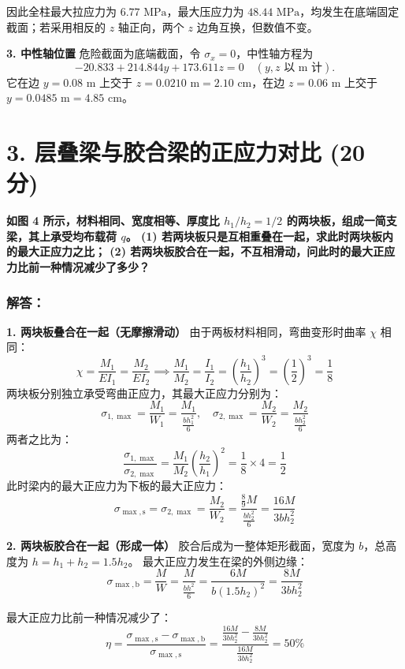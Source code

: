 \documentclass[11pt,a4paper]{ctexrep}
\begin{document}
{因此全柱最大拉应力为 $6.77\text{ MPa}$，最大压应力为 $48.44\text{ MPa}$，均发生在底端固定截面；若采用相反的 $z$ 轴正向，两个 $z$ 边角互换，但数值不变。

\textbf{3. 中性轴位置}
危险截面为底端截面，令 $\sigma_x=0$，中性轴方程为
\[
-20.833+214.844y+173.611z=0\quad(y,z\text{ 以 m 计}).
\]
它在边 $y=0.08\text{ m}$ 上交于 $z=0.0210\text{ m}=2.10\text{ cm}$，在边 $z=0.06\text{ m}$ 上交于 $y=0.0485\text{ m}=4.85\text{ cm}$。




\section*{3. 层叠梁与胶合梁的正应力对比 (20 分)}

\textbf{如图 4 所示，材料相同、宽度相等、厚度比 $h_1 / h_2 = 1/2$ 的两块板，组成一简支梁，其上承受均布载荷 $q$。
(1) 若两块板只是互相重叠在一起，求此时两块板内的最大正应力之比；
(2) 若两块板胶合在一起，不互相滑动，问此时的最大正应力比前一种情况减少了多少？}

\subsubsection*{解答：}

\textbf{1. 两块板叠合在一起（无摩擦滑动）}
由于两板材料相同，弯曲变形时曲率 $\chi$ 相同：
\[
\chi = \frac{M_1}{EI_1} = \frac{M_2}{EI_2} \implies \frac{M_1}{M_2} = \frac{I_1}{I_2} = \left(\frac{h_1}{h_2}\right)^3 = \left(\frac{1}{2}\right)^3 = \frac{1}{8}
\]
两块板分别独立承受弯曲正应力，其最大正应力分别为：
\[
\sigma_{1,\max} = \frac{M_1}{W_1} = \frac{M_1}{\frac{b h_1^2}{6}}, \quad \sigma_{2,\max} = \frac{M_2}{W_2} = \frac{M_2}{\frac{b h_2^2}{6}}
\]
两者之比为：
\[
\frac{\sigma_{1,\max}}{\sigma_{2,\max}} = \frac{M_1}{M_2} \left(\frac{h_2}{h_1}\right)^2 = \frac{1}{8} \times 4 = \frac{1}{2}
\]
此时梁内的最大正应力为下板的最大正应力：
\[
\sigma_{\max, \mathrm{s}} = \sigma_{2,\max} = \frac{M_2}{W_2} = \frac{\frac{8}{9}M}{\frac{b h_2^2}{6}} = \frac{16M}{3b h_2^2}
\]

\textbf{2. 两块板胶合在一起（形成一体）}
胶合后成为一整体矩形截面，宽度为 $b$，总高度为 $h = h_1 + h_2 = 1.5 h_2$。
最大正应力发生在梁的外侧边缘：
\[
\sigma_{\max, \mathrm{b}} = \frac{M}{W} = \frac{M}{\frac{bh^2}{6}} = \frac{6M}{b (1.5 h_2)^2} = \frac{8M}{3b h_2^2}
\]

最大正应力比前一种情况减少了：
\[
\eta = \frac{\sigma_{\max, \mathrm{s}} - \sigma_{\max, \mathrm{b}}}{\sigma_{\max, \mathrm{s}}} = \frac{\frac{16M}{3b h_2^2} - \frac{8M}{3b h_2^2}}{\frac{16M}{3b h_2^2}} = 50\%
\]


}
\end{document}
